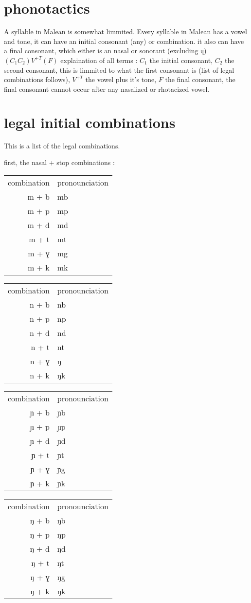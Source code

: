 \documentclass{article}
\begin{document}
\section{phonotactics}
A syllable in Malean is somewhat limmited. Every syllable in Malean has a vowel and tone, it can have an initial consonant (any) or combination. it also can have a final consonant, which either is an nasal or sonorant (excluding ɥ) $ (C_{1}C_{2})V^{+T}(F) $ explaination of all terms : $ C_{1} $ the initial consonant, $ C_{2} $ the second consonant, this is limmited to what the first consonant is (list of legal combinations follows), $V^{+T}$ the vowel plus it's tone, $ F $ the final consonant, the final consonant cannot occur after any nasalized or rhotacized vowel.

\pagebreak
\section{legal initial combinations}
This is a list of the legal combinations.

first, the nasal + stop combinations :

\begin{tabular}{r|l}
combination & pronounciation\\
m + b & mb\\
m + p & mp\\
m + d & md\\
m + t & mt\\
m + ɣ & mg\\
m + k & mk\\
\end{tabular}
\begin{tabular}{r|l}
combination & pronounciation\\
n + b & nb\\
n + p & np\\
n + d & nd\\
n + t & nt\\
n + ɣ & ŋ\\
n + k & ŋk\\
\end{tabular}

\begin{tabular}{r|l}
combination & pronounciation\\
ɲ + b & ɲb\\
ɲ + p & ɲp\\
ɲ + d & ɲd\\
ɲ + t & ɲt\\
ɲ + ɣ & ɲg\\
ɲ + k & ɲk\\
\end{tabular}
\begin{tabular}{r|l}
combination & pronounciation\\
ŋ + b & ŋb\\
ŋ + p & ŋp\\
ŋ + d & ŋd\\
ŋ + t & ŋt\\
ŋ + ɣ & ŋg\\
ŋ + k & ŋk\\
\end{tabular}
\end{document}
